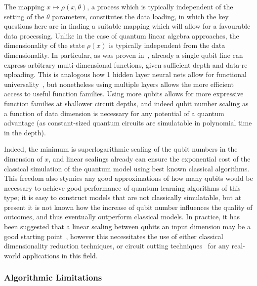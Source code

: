 The mapping $x \mapsto \rho(x, \theta)$, a process which is typically independent of the setting of the $\theta$ parameters, constitutes the data loading, in which the key questions here are in finding a suitable mapping which will allow for a favourable data processing. Unlike in the case of quantum linear algebra approaches, the dimensionality of the state $\rho(x)$ is typically independent from the data dimensionality. In particular, as was proven in~\cite{P_rez_Salinas_2020}, already a single qubit line can express arbitrary multi-dimensional functions, given sufficient depth and data-re uploading. This is analogous how 1 hidden layer neural nets allow for functional universality~\cite{Cybenko1989ApproximationBS}, but nonetheless using multiple layers allows the more efficient access to useful function families. 
Using more qubits allows for more expressive function families at shallower circuit depths, and indeed qubit number scaling as a function of data dimension is necessary for any potential of a quantum advantage (as constant-sized quantum circuits are simulatable in polynomial time in the depth).

Indeed, the minimum is superlogarithmic scaling of the qubit numbers in the dimension of $x$, and linear scalings already can ensure the exponential cost of the classical simulation of the quantum model using best known classical algorithms.
This freedom also stymies any good approximations of how many qubits would be necessary to achieve good performance of quantum learning algorithms of this type; it is easy to construct models that are not classically simulatable, but at present it is not known how the increase of qubit number influences the quality of outcomes, and thus eventually outperform classical models.
In practice, it has been suggested that a linear scaling between qubits an input dimension may be a good starting point~\cite{Schuld2019QML}, however this necessitates the use of either classical dimensionality reduction techniques, or circuit cutting techniques~\cite{Marshall:2022jld} for any real-world applications in this field.


\subsubsection{Algorithmic Limitations\label{subsec:qml_limitations}}

